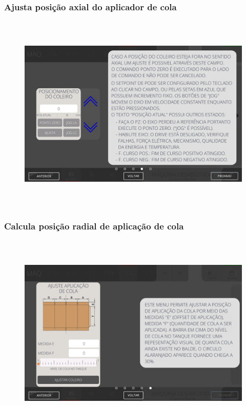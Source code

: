 \newpage
\thispagestyle{fancy}
\vspace*{40 pt}
\subsubsection{\small{Ajusta posição axial do aplicador de cola}}
\vspace*{\fill}
\begin{figure}[h]
  \centering
  \includegraphics[width=576px,height=360px]{src/imagesFlexo/07-fold/settings/e-4.png}
\end{figure}
\vspace*{\fill}

\newpage
\thispagestyle{fancy}
\vspace*{40 pt}
\subsubsection{\small{Calcula posição radial de aplicação de cola}}
\vspace*{\fill}
\begin{figure}[h]
  \centering
  \includegraphics[width=576px,height=360px]{src/imagesFlexo/07-fold/settings/e-5.png}
\end{figure}
\vspace*{\fill}

